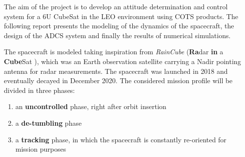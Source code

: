 The aim of the project is to develop an attitude determination and control system for a 6U CubeSat in the LEO environment using COTS products. The following report presents the modeling of the dynamics of the spacecraft, the design of the ADCS system and finally the results of numerical simulations.

The spacecraft is modeled taking inspiration from \textit{RainCube} (\textbf{Ra}dar \textbf{in} a \textbf{Cube}Sat \cite{raincube}), which was an Earth observation satellite carrying a Nadir pointing antenna for radar measurements. The spacecraft was launched in 2018 and eventually decayed in December 2020. The considered mission profile will be divided in three phases:

\begin{enumerate}
    \item an \textbf{uncontrolled} phase, right after orbit insertion
    \item a \textbf{de-tumbling} phase
    \item a \textbf{tracking} phase, in which the spacecraft is constantly re-oriented for mission purposes
\end{enumerate}
